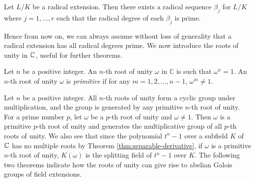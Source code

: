 \begin{corollary} \label{thm:radical-all-prime}
	Let $L / K$ be a radical extension. Then there exists a radical sequence $\beta_j$ for $L / K$ where $j=1, \dots, r$ such that the radical degree of each $\beta_j$ is prime.
\end{corollary}


Hence from now on, we can always assume without loss of generality that a radical extension has all radical degrees prime. We now introduce the roots of unity in $\mathbb C$, useful for further theorems. 


\begin{definition}
	Let $n$ be a positive integer. An $n$-th root of unity $\omega$ in $\mathbb C$ is such that $\omega ^ n = 1$. An $n$-th root of unity $\omega$ is \textit{primitive} if for any $m = 1, 2, \dots, n - 1$, $\omega ^ m \neq 1$.
\end{definition}


Let $n$ be a positive integer. All $n$-th roots of unity form a cyclic group under multiplication, and the group is generated by any primitive $n$-th root of unity. For a prime number $p$, let $\omega$ be a $p$-th root of unity and $\omega \neq 1$. Then $\omega$ is a primitive $p$-th root of unity and generates the multiplicative group of all $p$-th roots of unity. We also see that since the polynomial $t^n - 1$ over a subfield $K$ of $\mathbb C$ has no multiple roots by Theorem \ref{thm:separable-derivative}, if $\omega$ is a primitive $n$-th root of unity, $K(\omega)$ is the splitting field of $t^n - 1$ over $K$. The following two theorems indicate how the roots of unity can give rise to abelian Galois groups of field extensions. 




